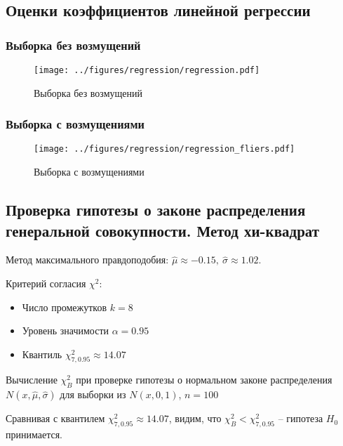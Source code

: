 \documentclass[12pt]{article}
\begin{document}
	\subsection{Оценки коэффициентов линейной регрессии}
	
	\subsubsection{Выборка без возмущений}
	
	\begin{figure}[H]
		\centering
		\texttt{[image: ../figures/regression/regression.pdf]}
		\caption{Выборка без возмущений}
	\end{figure}

	\subsubsection{Выборка с возмущениями}

	\begin{figure}[H]
		\centering
		\texttt{[image: ../figures/regression/regression\_fliers.pdf]}
		\caption{Выборка с возмущениями}
	\end{figure}
	
	\subsection{Проверка гипотезы о законе распределения генеральной совокупности. Метод хи-квадрат}
	
	Метод максимального правдоподобия: $\widehat{\mu} \approx -0.15,\ \widehat{\sigma} \approx 1.02$.
	
	Критерий согласия $\chi^2$:
	\begin{itemize}
		\item Число промежутков $k=8$
		\item Уровень значимости $\alpha = 0.95$
		\item Квантиль $\chi^2_{7,0.95}\approx14.07$
	\end{itemize}
	
	\begin{table}[H]
		\centering
		
		\caption{Вычисление $\chi^2_B$ при проверке гипотезы о нормальном законе распределения $N(x, \widehat{\mu}, \widehat{\sigma})$ для выборки из $N(x, 0, 1)$, $n = 100$}
	\end{table}

	Сравнивая с квантилем $\chi^2_{7, 0.95} \approx 14.07$, видим, что  $\chi^2_B < \chi^2_{7, 0.95}$ -- гипотеза $H_0$ принимается.
\end{document}
